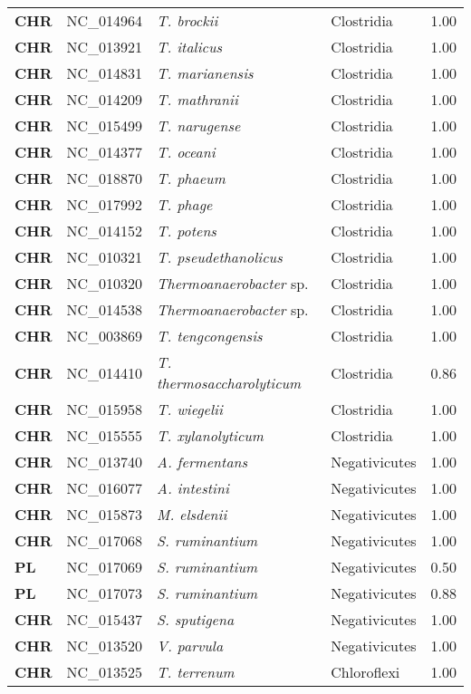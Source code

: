 \begin{adjustwidth}{-3cm}{2cm}
{\begin{supertabular}{>{\bfseries}l|p{0.1\textwidth}p{0.14\textwidth}l|l}
CHR & NC\_014964 & \textit{T. brockii} & Clostridia & 1.00\\
CHR & NC\_013921 & \textit{T. italicus} & Clostridia & 1.00\\
CHR & NC\_014831 & \textit{T. marianensis} & Clostridia & 1.00\\
CHR & NC\_014209 & \textit{T. mathranii} & Clostridia & 1.00\\
CHR & NC\_015499 & \textit{T. narugense} & Clostridia & 1.00\\
CHR & NC\_014377 & \textit{T. oceani} & Clostridia & 1.00\\
CHR & NC\_018870 & \textit{T. phaeum} & Clostridia & 1.00\\
CHR & NC\_017992 & \textit{T. phage} & Clostridia & 1.00\\
CHR & NC\_014152 & \textit{T. potens} & Clostridia & 1.00\\
CHR & NC\_010321 & \textit{T. pseudethanolicus} & Clostridia & 1.00\\
CHR & NC\_010320 & \textit{Thermoanaerobacter} sp. & Clostridia & 1.00\\
CHR & NC\_014538 & \textit{Thermoanaerobacter} sp. & Clostridia & 1.00\\
CHR & NC\_003869 & \textit{T. tengcongensis} & Clostridia & 1.00\\
CHR & NC\_014410 & \textit{T. thermosaccharolyticum} & Clostridia & 0.86\\
CHR & NC\_015958 & \textit{T. wiegelii} & Clostridia & 1.00\\
CHR & NC\_015555 & \textit{T. xylanolyticum} & Clostridia & 1.00\\
CHR & NC\_013740 & \textit{A. fermentans} & Negativicutes & 1.00\\
CHR & NC\_016077 & \textit{A. intestini} & Negativicutes & 1.00\\
CHR & NC\_015873 & \textit{M. elsdenii} & Negativicutes & 1.00\\
CHR & NC\_017068 & \textit{S. ruminantium} & Negativicutes & 1.00\\
PL & NC\_017069 & \textit{S. ruminantium} & Negativicutes & 0.50\\
PL & NC\_017073 & \textit{S. ruminantium} & Negativicutes & 0.88\\
CHR & NC\_015437 & \textit{S. sputigena} & Negativicutes & 1.00\\
CHR & NC\_013520 & \textit{V. parvula} & Negativicutes & 1.00\\
CHR & NC\_013525 & \textit{T. terrenum} & Chloroflexi & 1.00\\

\end{supertabular}}
\end{adjustwidth}
